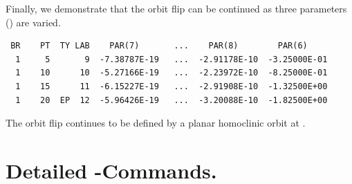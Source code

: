 \documentclass[12pt]{report}
\begin{document}
Finally, we demonstrate that the orbit flip can be continued as 
three parameters () are varied. 
\begin{center}
\end{center}
\begin{verbatim}
 BR    PT  TY LAB    PAR(7)       ...    PAR(8)        PAR(6)     
  1     5       9  -7.38787E-19   ...  -2.91178E-10  -3.25000E-01
  1    10      10  -5.27166E-19   ...  -2.23972E-10  -8.25000E-01
  1    15      11  -6.15227E-19   ...  -2.91908E-10  -1.32500E+00
  1    20  EP  12  -5.96426E-19   ...  -3.20088E-10  -1.82500E+00
\end{verbatim}
The orbit flip continues to be defined by a planar homoclinic orbit
at .

\section{ Detailed \AUTO-Commands.}
\end{document}

